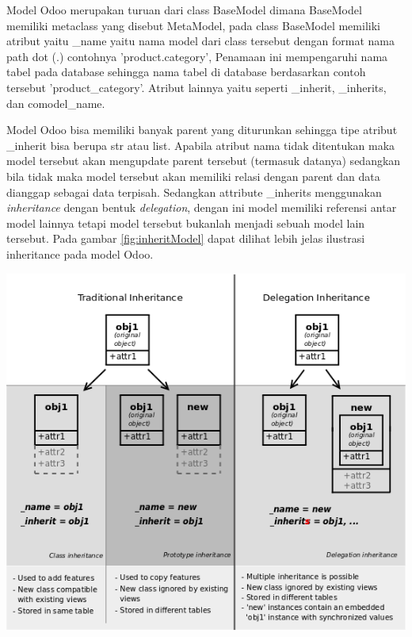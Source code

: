 Model Odoo merupakan turuan dari class BaseModel dimana BaseModel memiliki metaclass yang disebut MetaModel, pada class BaseModel memiliki atribut yaitu {\_}name yaitu nama model dari class tersebut dengan format nama path dot (.) contohnya 'product.category', Penamaan ini mempengaruhi nama tabel pada database sehingga nama tabel di database berdasarkan contoh tersebut 'product{\_}category'. Atribut lainnya yaitu seperti {\_}inherit, {\_}inherits, dan comodel{\_}name.
 
Model Odoo bisa memiliki banyak parent yang diturunkan sehingga tipe atribut {\_}inherit bisa berupa str atau list. Apabila atribut nama tidak ditentukan maka model tersebut akan mengupdate parent tersebut (termasuk datanya) sedangkan bila tidak maka model tersebut akan memiliki relasi dengan parent dan data dianggap sebagai data terpisah. Sedangkan attribute {\_}inherits menggunakan \textit{inheritance} dengan bentuk \textit{delegation}, dengan ini model memiliki referensi antar model lainnya tetapi model tersebut bukanlah menjadi sebuah model lain tersebut. Pada gambar \ref{fig:inheritModel} dapat dilihat lebih jelas ilustrasi inheritance pada model Odoo.

\begin{center}
	\includegraphics[width=14cm]{img/bab_2/inheritance_odoo.png}
	\label{fig:inheritModel}
\end{center}

